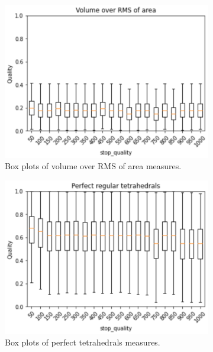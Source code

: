 \begin{figure}
	\centering
	\begin{subfigure}[b]{0.49\linewidth}
		\centering
		\includegraphics[width=\linewidth]{Materials/E1/voabox}
		\caption{Box plots of volume over RMS of area measures.}
		\label{voabox}
	\end{subfigure}
	\hfill
	\begin{subfigure}[b]{0.49\linewidth}
		\centering
		\includegraphics[width=\linewidth]{Materials/E1/ptbox}
		\caption{Box plots of perfect tetrahedrals measures.}
		\label{ptbox}
	\end{subfigure}
	\\
	\begin{subfigure}[b]{0.49\linewidth}

\end{subfigure}
\end{figure}
